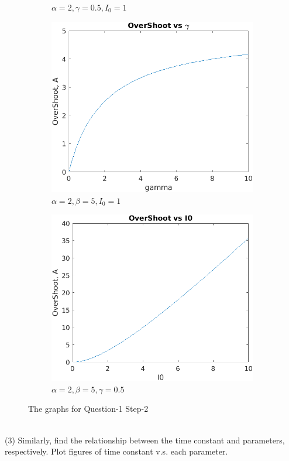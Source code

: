 \documentclass[12pt,letterpaper]{article}
\theoremstyle{definition}
\begin{document}
\begin{figure}[h]
\begin{subfigure}[b]{0.4\textwidth}
         \caption{$\alpha = 2, \gamma = 0.5, I_0 = 1$}
         \label{fig:three sin x}
     \end{subfigure}
     \begin{subfigure}[b]{0.4\textwidth}
         \centering
         \includegraphics[width=\textwidth]{picture/Figure_1-2gama.png}
         \caption{$\alpha = 2, \beta = 5, I_0 = 1$}
         \label{fig:five over x}
     \end{subfigure}
    \begin{subfigure}[b]{0.4\textwidth}
         \centering
         \includegraphics[width=\textwidth]{picture/Figure_1-2I0.png}
         \caption{$\alpha = 2, \beta = 5, \gamma = 0.5$}
         \label{fig:five over x}
     \end{subfigure}
        \caption{The graphs for Question-1 Step-2}
        \label{fig:fourgraphsforq2}
\end{figure}
\\
(3) Similarly, find the relationship between the time constant and parameters, respectively. Plot figures of time constant v.s. each parameter.
\end{document}
